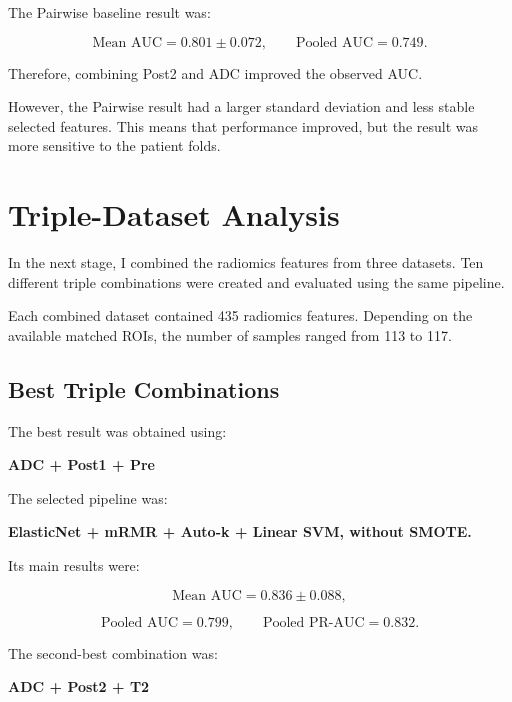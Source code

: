 \documentclass[10pt,a4paper]{article}
\begin{document}
The Pairwise baseline result was:

\[
\text{Mean AUC}=0.801\pm0.072,
\qquad
\text{Pooled AUC}=0.749.
\]

Therefore, combining Post2 and ADC improved the observed AUC.

However, the Pairwise result had a larger standard deviation and less stable selected features. This means that performance improved, but the result was more sensitive to the patient folds.







\section{Triple-Dataset Analysis}

In the next stage, I combined the radiomics features from three datasets. Ten different triple combinations were created and evaluated using the same pipeline.

Each combined dataset contained 435 radiomics features. Depending on the available matched ROIs, the number of samples ranged from 113 to 117.


\subsection{Best Triple Combinations}

The best result was obtained using:

\begin{center}
\textbf{ADC + Post1 + Pre}
\end{center}

The selected pipeline was:

\begin{center}
\textbf{ElasticNet + mRMR + Auto-k
+ Linear SVM, without SMOTE.}
\end{center}

Its main results were:

\[
\text{Mean AUC}=0.836\pm0.088,
\]

\[
\text{Pooled AUC}=0.799,
\qquad
\text{Pooled PR-AUC}=0.832.
\]

The second-best combination was:

\begin{center}
\textbf{ADC + Post2 + T2}
\end{center}
\end{document}
